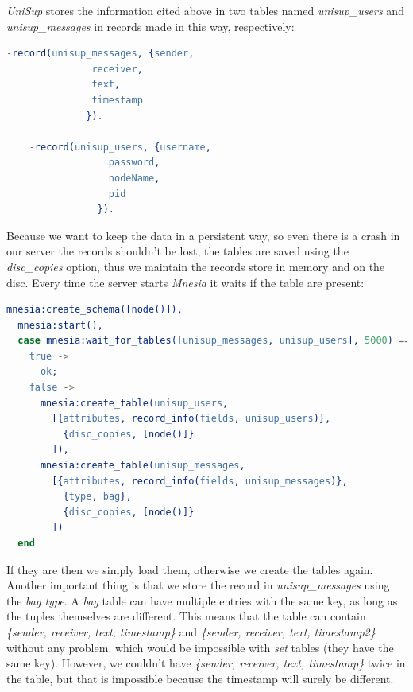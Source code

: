 \textit{UniSup} stores the information cited above in two tables named \textit{unisup\_users} and \textit{unisup\_messages} in records made in this way, respectively:
\begin{lstlisting}[language=erlang]
	-record(unisup_messages, {sender,
               receiver,
               text,
               timestamp
              }).

	-record(unisup_users, {username,
                  password,
                  nodeName,
                  pid
                }).
\end{lstlisting}

Because we want to keep the data in a persistent way, so even there is a crash in our server the records shouldn't be lost, the tables are saved using the \textit{disc\_copies} option, thus we maintain the records store in memory and on the disc. Every time the server starts \textit{Mnesia} it waits if the table are present:

\begin{lstlisting}[language=erlang]
mnesia:create_schema([node()]),
  mnesia:start(),
  case mnesia:wait_for_tables([unisup_messages, unisup_users], 5000) == ok of
    true ->
      ok;
    false ->
      mnesia:create_table(unisup_users,
        [{attributes, record_info(fields, unisup_users)},
          {disc_copies, [node()]}
        ]),
      mnesia:create_table(unisup_messages,
        [{attributes, record_info(fields, unisup_messages)},
          {type, bag},
          {disc_copies, [node()]}
        ])
  end
\end{lstlisting}
If they are then we simply load them, otherwise we create the tables again.
Another important thing is that we store the record in \textit{unisup\_messages}  using the \textit{bag type}. A \textit{bag} table can have multiple entries with the same key, as long as the tuples themselves are different. This means that the table can contain \textit{\{sender, receiver, text, timestamp\}} and \textit{\{sender, receiver, text, timestamp2\}} without any problem. which would be impossible with \textit{set} tables (they have the same key). However, we couldn't have \textit{\{sender, receiver, text, timestamp\}} twice in the table, but that is impossible because the timestamp will surely be different. 

